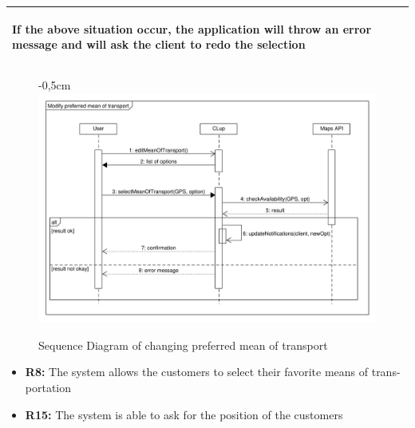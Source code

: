 \documentclass{article}
\begin{document}
\begin{center}
\begin{adjustwidth}{-1.5cm}{}
\begin{tabular}[h!]{|m{7.5em}|m{27.5em}|}
\begin{enumerate}
							\end{enumerate}
							
							If the above situation occur, the application will throw an error message and will ask the client to redo the selection \\
							\hline
							
						\end{tabular}
					\end{adjustwidth}
					
					\begin{figure}[!htb]
						\begin{adjustwidth} {-0,5cm}{}
							\centering
							\includegraphics[scale=0.42]{SD/12_selectPreferredMeanOfTransport.pdf}\\
							\caption{Sequence Diagram of changing preferred mean of transport}
						\end{adjustwidth}

					\end{figure}
					
					
					\begin{itemize}
						\medskip
						\newpage
						{\bfseries Required functional requirements: }
						
						
						\item {\bfseries R8: } The system allows the customers to select their favorite means of trans-
						portation
						\item {\bfseries R15: } The system is able to ask for the position of the customers
											
						
					\end{itemize}
				\end{center}
		
\end{document}
